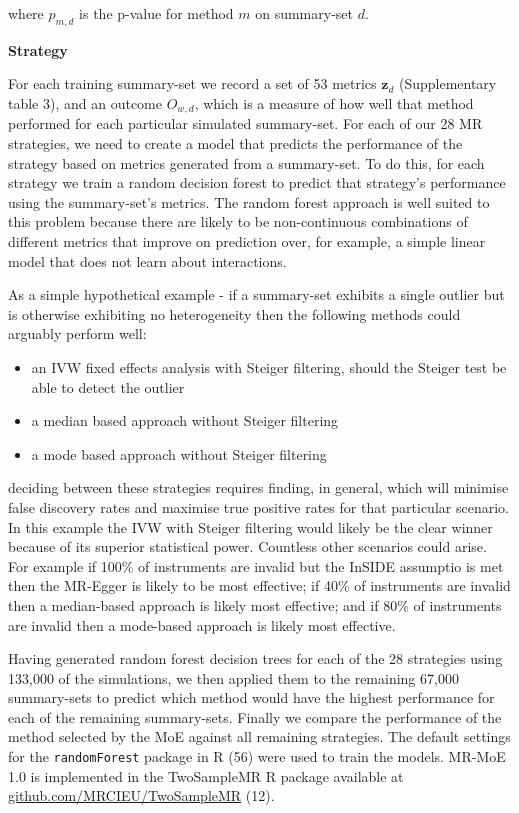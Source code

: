 \documentclass[]{article}
\providecommand{\tightlist}{%
  \setlength{\itemsep}{0pt}\setlength{\parskip}{0pt}}
\begin{document}
where \(p_{m,d}\) is the p-value for method \(m\) on summary-set \(d\).

\textbf{Strategy}

For each training summary-set we record a set of 53 metrics
\(\textbf{z}_{d}\) (Supplementary table 3), and an outcome \(O_{w,d}\),
which is a measure of how well that method performed for each particular
simulated summary-set. For each of our 28 MR strategies, we need to
create a model that predicts the performance of the strategy based on
metrics generated from a summary-set. To do this, for each strategy we
train a random decision forest to predict that strategy's performance
using the summary-set's metrics. The random forest approach is well
suited to this problem because there are likely to be non-continuous
combinations of different metrics that improve on prediction over, for
example, a simple linear model that does not learn about interactions.

As a simple hypothetical example - if a summary-set exhibits a single
outlier but is otherwise exhibiting no heterogeneity then the following
methods could arguably perform well:

\begin{itemize}
\tightlist
\item
  an IVW fixed effects analysis with Steiger filtering, should the
  Steiger test be able to detect the outlier
\item
  a median based approach without Steiger filtering
\item
  a mode based approach without Steiger filtering
\end{itemize}

deciding between these strategies requires finding, in general, which
will minimise false discovery rates and maximise true positive rates for
that particular scenario. In this example the IVW with Steiger filtering
would likely be the clear winner because of its superior statistical
power. Countless other scenarios could arise. For example if 100\% of
instruments are invalid but the InSIDE assumptio is met then the
MR-Egger is likely to be most effective; if 40\% of instruments are
invalid then a median-based approach is likely most effective; and if
80\% of instruments are invalid then a mode-based approach is likely
most effective.

Having generated random forest decision trees for each of the 28
strategies using 133,000 of the simulations, we then applied them to the
remaining 67,000 summary-sets to predict which method would have the
highest performance for each of the remaining summary-sets. Finally we
compare the performance of the method selected by the MoE against all
remaining strategies. The default settings for the \texttt{randomForest}
package in R (56) were used to train the models. MR-MoE 1.0 is
implemented in the TwoSampleMR R package available at
\href{https://github.com/MRCIEU/TwoSampleMR}{github.com/MRCIEU/TwoSampleMR}
(12).
\end{document}
